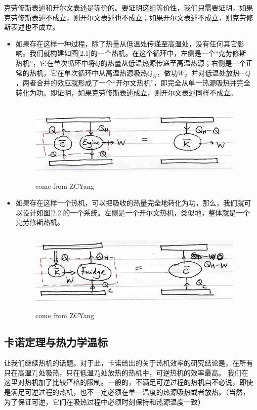 \documentclass[a4paper, 10pt, openany]{book}%
\begin{document}
克劳修斯表述和开尔文表述是等价的。要证明这组等价性，我们只需要证明，如果克劳修斯表述不成立，则开尔文表述也不成立；如果开尔文表述不成立，则克劳修斯表述也不成立。

\begin{itemize}
  \item 如果存在这样一种过程，除了热量从低温处传递至高温处，没有任何其它影响。我们就构建如图[2.1]的一个热机。在这个循环中，左侧是一个“克劳修斯热机”，它在单次循环中将$Q$的热量从低温热源传递至高温热源；右侧是一个正常的热机，它在单次循环中从高温热源吸热$Q_{H}$，做功$W$，并对低温处放热$-Q$，两者合并的效应就形成了一个“开尔文热机”，即完全从单一热源吸热并完全转化为功。即证明，如果克劳修斯表述成立，则开尔文表述同样不成立。
  
  \begin{figure}[h]
    \centering 
    \includegraphics[height=4.0cm]{3.png}
    
    \caption{come from ZCYang}
    
    
    \end{figure}
  
  \item 如果存在这样一个热机，可以把吸收的热量完全地转化为功，那么，我们就可以设计如图[2.2]的一个系统。左侧是一个开尔文热机，类似地，整体就是一个克劳修斯热机。


  \begin{figure}[h]
    \centering 
    \includegraphics[height=4.0cm]{4.png}
    
    \caption{come from ZCYang}
    
    
    \end{figure}

\end{itemize}
\subsection{卡诺定理与热力学温标}
让我们继续热机的话题。对于此，卡诺给出的关于热机效率的研究结论是，在所有只在高温$T_1$处吸热，只在低温$T_2$处放热的热机中，可逆热机的效率最高。
我们在这里对热机加了比较严格的限制。一般的，不满足可逆过程的热机自不必说，即使是满足可逆过程的热机，也不一定必须在单一温度的热源吸热或者放热。（当然，为了保证可逆，它们在吸热过程中必须时刻保持和热源温度一致）
\end{document}
